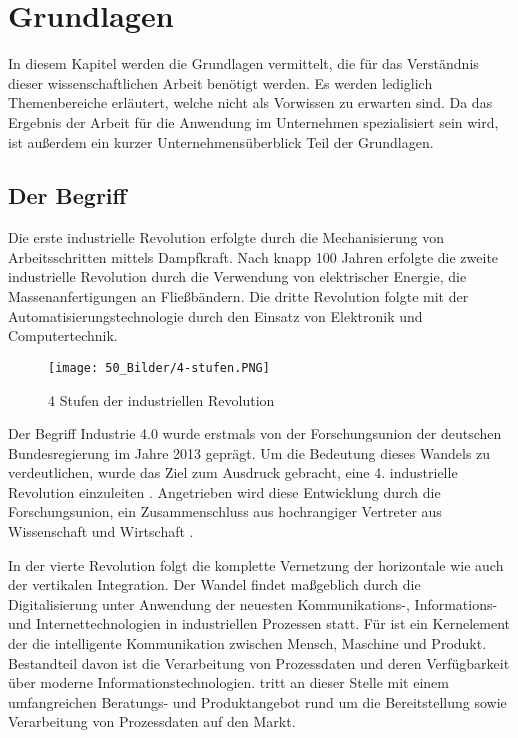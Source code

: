 \chapter{Grundlagen}\label{chap:Grundlagen}

In diesem Kapitel werden die Grundlagen vermittelt, die für das Verständnis dieser wissenschaftlichen Arbeit benötigt werden. Es werden lediglich Themenbereiche erläutert, welche nicht als Vorwissen zu erwarten sind. Da das Ergebnis der Arbeit für die Anwendung im Unternehmen  spezialisiert sein wird, ist außerdem ein kurzer Unternehmensüberblick Teil der Grundlagen.

\section{Der Begriff }\label{sec:2_Industrie4}


Die erste industrielle Revolution erfolgte durch die Mechanisierung von Arbeitsschritten mittels Dampfkraft. Nach knapp 100 Jahren erfolgte die zweite industrielle Revolution durch die Verwendung von elektrischer Energie, die Massenanfertigungen an Fließbändern. Die dritte Revolution folgte mit der Automatisierungstechnologie durch den Einsatz von Elektronik und Computertechnik.

\begin{figure}[h]
	\centering
	\vspace{0.2cm}
	\texttt{[image: 50\_Bilder/4-stufen.PNG]}
	\caption[4 Stufen der industriellen Revolution]{4 Stufen der industriellen Revolution \cite{Kaufmann.2015}}\label{abb:stufen}
\end{figure}

Der Begriff Industrie 4.0 wurde erstmals von der Forschungsunion der deutschen Bundesregierung im Jahre 2013 geprägt. Um die Bedeutung dieses Wandels zu verdeutlichen, wurde das Ziel zum Ausdruck gebracht, eine 4. industrielle Revolution einzuleiten \cite{Kagermann.}. Angetrieben wird diese Entwicklung durch die Forschungsunion, ein Zusammenschluss aus hochrangiger Vertreter aus Wissenschaft und Wirtschaft \cite{.2018}.

In der vierte Revolution folgt die komplette Vernetzung der horizontale wie auch der vertikalen Integration. Der Wandel findet maßgeblich durch die Digitalisierung unter Anwendung der neuesten Kommunikations-, Informations- und Internettechnologien in industriellen Prozessen statt. Für  ist ein Kernelement der  die intelligente Kommunikation zwischen Mensch, Maschine und Produkt. Bestandteil davon ist die Verarbeitung von Prozessdaten und deren Verfügbarkeit über moderne Informationstechnologien.  tritt an dieser Stelle mit einem umfangreichen Beratungs- und Produktangebot rund um die Bereitstellung sowie Verarbeitung von Prozessdaten auf den Markt.

